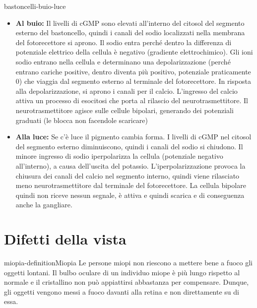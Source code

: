 \documentclass[preview]{standalone}
\begin{document}
\begin{snippet}{bastoncelli-buio-luce}
    \begin{itemize}
        \item \textbf{Al buio:}
            Il livelli di cGMP sono elevati all'interno del citosol del segmento esterno
            del bastoncello, quindi i canali del sodio localizzati nella membrana del fotorecettore
            si aprono. Il sodio entra perché dentro la differenza di potenziale
            elettrico della cellula è negativo (gradiente elettrochimico).
            Gli ioni sodio entrano nella cellula e determinano una depolarizzazione
            (perché entrano cariche positive, dentro diventa più positivo, potenziale praticamente 0) che viaggia
            dal segmento esterno al terminale del fotorecettore. 
            In risposta alla depolarizzazione, si aprono i canali per il calcio.
            L'ingresso del calcio attiva un processo di esocitosi che porta al rilascio del neurotrasmettitore.
            Il neurotrasmettitore agisce sulle cellule bipolari, generando dei potenziali graduati (le blocca non facendole scaricare)
        \item \textbf{Alla luce:}
            Se c'è luce il pigmento cambia forma. I livelli di cGMP nel citosol del segmento esterno diminuiscono, quindi i canali del sodio si chiudono.
            Il minore ingresso di sodio iperpolarizza la cellula (potenziale negativo all'interno),
            a causa dell'uscita del potassio.
            L'iperpolarizzazione provoca la chiusura dei canali del calcio nel segmento interno,
            quindi viene rilasciato meno neurotrasmettitore dal terminale del fotorecettore.
            La cellula bipolare quindi non riceve nessun segnale, è attiva e quindi scarica
            e di conseguenza anche la gangliare.
    \end{itemize}
\end{snippet}

\section{Difetti della vista}

\begin{snippetdefinition}{miopia-definition}{Miopia}
    Le persone miopi non riescono a mettere bene a fuoco gli oggetti lontani. Il bulbo oculare di
    un individuo miope è più lungo rispetto al normale e il cristallino non può appiattirsi
    abbastanza per compensare. Dunque, gli oggetti vengono messi a fuoco davanti alla retina
    e non direttamente su di essa.
\end{snippetdefinition}
\end{document}
